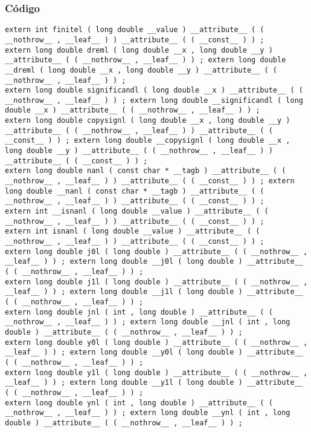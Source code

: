\documentclass{beamer}
\begin{document}
\begin{frame}[fragile]
\frametitle{C\'odigo}
\begin{verbatim}
extern int finitel ( long double __value ) __attribute__ ( ( __nothrow__ , __leaf__ ) ) __attribute__ ( ( __const__ ) ) ; 
extern long double dreml ( long double __x , long double __y ) __attribute__ ( ( __nothrow__ , __leaf__ ) ) ; extern long double __dreml ( long double __x , long double __y ) __attribute__ ( ( __nothrow__ , __leaf__ ) ) ; 
extern long double significandl ( long double __x ) __attribute__ ( ( __nothrow__ , __leaf__ ) ) ; extern long double __significandl ( long double __x ) __attribute__ ( ( __nothrow__ , __leaf__ ) ) ; 
extern long double copysignl ( long double __x , long double __y ) __attribute__ ( ( __nothrow__ , __leaf__ ) ) __attribute__ ( ( __const__ ) ) ; extern long double __copysignl ( long double __x , long double __y ) __attribute__ ( ( __nothrow__ , __leaf__ ) ) __attribute__ ( ( __const__ ) ) ; 
extern long double nanl ( const char * __tagb ) __attribute__ ( ( __nothrow__ , __leaf__ ) ) __attribute__ ( ( __const__ ) ) ; extern long double __nanl ( const char * __tagb ) __attribute__ ( ( __nothrow__ , __leaf__ ) ) __attribute__ ( ( __const__ ) ) ; 
extern int __isnanl ( long double __value ) __attribute__ ( ( __nothrow__ , __leaf__ ) ) __attribute__ ( ( __const__ ) ) ; 
extern int isnanl ( long double __value ) __attribute__ ( ( __nothrow__ , __leaf__ ) ) __attribute__ ( ( __const__ ) ) ; 
extern long double j0l ( long double ) __attribute__ ( ( __nothrow__ , __leaf__ ) ) ; extern long double __j0l ( long double ) __attribute__ ( ( __nothrow__ , __leaf__ ) ) ; 
extern long double j1l ( long double ) __attribute__ ( ( __nothrow__ , __leaf__ ) ) ; extern long double __j1l ( long double ) __attribute__ ( ( __nothrow__ , __leaf__ ) ) ; 
extern long double jnl ( int , long double ) __attribute__ ( ( __nothrow__ , __leaf__ ) ) ; extern long double __jnl ( int , long double ) __attribute__ ( ( __nothrow__ , __leaf__ ) ) ; 
extern long double y0l ( long double ) __attribute__ ( ( __nothrow__ , __leaf__ ) ) ; extern long double __y0l ( long double ) __attribute__ ( ( __nothrow__ , __leaf__ ) ) ; 
extern long double y1l ( long double ) __attribute__ ( ( __nothrow__ , __leaf__ ) ) ; extern long double __y1l ( long double ) __attribute__ ( ( __nothrow__ , __leaf__ ) ) ; 
extern long double ynl ( int , long double ) __attribute__ ( ( __nothrow__ , __leaf__ ) ) ; extern long double __ynl ( int , long double ) __attribute__ ( ( __nothrow__ , __leaf__ ) ) ; 
\end{verbatim}
\end{frame}
\end{document}
